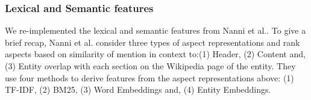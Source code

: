 \documentclass[sigconf,authordraft]{acmart}
\begin{document}
    


\subsubsection{Lexical and Semantic features}
\label{subsubsec:Lexical and Semantic features} 
We re-implemented the lexical and semantic features from Nanni et al.\cite{nanni2018entity}. To give a brief recap, Nanni et al.\cite{nanni2018entity} consider three types of aspect representations and rank aspects based on similarity of mention in context to:(1) Header, (2) Content and, (3) Entity overlap with each section on the Wikipedia page of the entity. They use four methods to derive features from the aspect representations above: (1) TF-IDF, (2) BM25, (3) Word Embeddings and, (4) Entity Embeddings.
\end{document}
